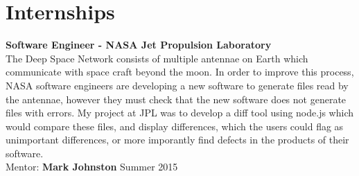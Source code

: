 \documentclass[8pt]{article}
\renewenvironment{itemize}{
  \begin{list}{}{
    \setlength{\leftmargin}{1.5em}
  }
}{
  \end{list}
}
\begin{document}
\section*{Internships}
\begin{itemize}
\item \textbf{Software Engineer - NASA Jet Propulsion Laboratory}\\
  The Deep Space Network consists of multiple antennae on Earth which communicate with space craft beyond the moon. In order to improve this process, NASA software engineers are developing a new software to generate files read by the antennae, however they must check that the new software does not generate files with errors. My project at JPL was to develop a diff tool using node.js which would compare these files, and display differences, which the users could flag as unimportant differences, or more imporantly find defects in the products of their software.\\
  Mentor: \textbf{Mark Johnston} \hfill Summer 2015


\end{itemize}


 
 
\end{document}
